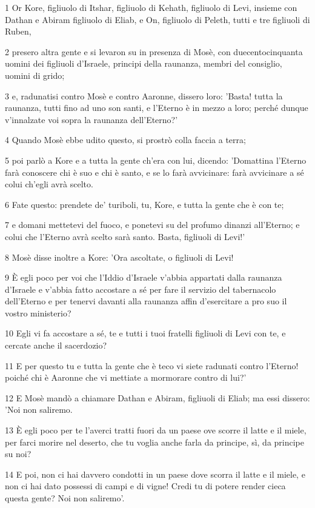 \par 1 Or Kore, figliuolo di Itshar, figliuolo di Kehath, figliuolo di Levi, insieme con Dathan e Abiram figliuolo di Eliab, e On, figliuolo di Peleth, tutti e tre figliuoli di Ruben,
\par 2 presero altra gente e si levaron su in presenza di Mosè, con duecentocinquanta uomini dei figliuoli d'Israele, principi della raunanza, membri del consiglio, uomini di grido;
\par 3 e, radunatisi contro Mosè e contro Aaronne, dissero loro: 'Basta! tutta la raunanza, tutti fino ad uno son santi, e l'Eterno è in mezzo a loro; perché dunque v'innalzate voi sopra la raunanza dell'Eterno?'
\par 4 Quando Mosè ebbe udito questo, si prostrò colla faccia a terra;
\par 5 poi parlò a Kore e a tutta la gente ch'era con lui, dicendo: 'Domattina l'Eterno farà conoscere chi è suo e chi è santo, e se lo farà avvicinare: farà avvicinare a sé colui ch'egli avrà scelto.
\par 6 Fate questo: prendete de' turiboli, tu, Kore, e tutta la gente che è con te;
\par 7 e domani mettetevi del fuoco, e ponetevi su del profumo dinanzi all'Eterno; e colui che l'Eterno avrà scelto sarà santo. Basta, figliuoli di Levi!'
\par 8 Mosè disse inoltre a Kore: 'Ora ascoltate, o figliuoli di Levi!
\par 9 È egli poco per voi che l'Iddio d'Israele v'abbia appartati dalla raunanza d'Israele e v'abbia fatto accostare a sé per fare il servizio del tabernacolo dell'Eterno e per tenervi davanti alla raunanza affin d'esercitare a pro suo il vostro ministerio?
\par 10 Egli vi fa accostare a sé, te e tutti i tuoi fratelli figliuoli di Levi con te, e cercate anche il sacerdozio?
\par 11 E per questo tu e tutta la gente che è teco vi siete radunati contro l'Eterno! poiché chi è Aaronne che vi mettiate a mormorare contro di lui?'
\par 12 E Mosè mandò a chiamare Dathan e Abiram, figliuoli di Eliab; ma essi dissero: 'Noi non saliremo.
\par 13 È egli poco per te l'averci tratti fuori da un paese ove scorre il latte e il miele, per farci morire nel deserto, che tu voglia anche farla da principe, sì, da principe su noi?
\par 14 E poi, non ci hai davvero condotti in un paese dove scorra il latte e il miele, e non ci hai dato possessi di campi e di vigne! Credi tu di potere render cieca questa gente? Noi non saliremo'.
